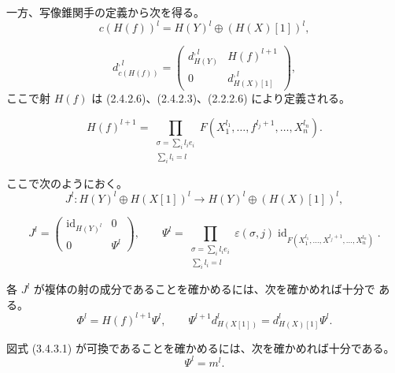 \clearpage
{}%
\begingroup
\small
\setlength{\abovedisplayskip}{3pt plus 2pt minus 2pt}%
\setlength{\belowdisplayskip}{3pt plus 2pt minus 2pt}%
\setlength{\jot}{2pt}%

一方、写像錐関手の定義から次を得る。
\[
  c(H(f))^l=H(Y)^l\oplus(H(X)[1])^l,
\]

\begin{equation}
  d_{c(H(f))}^{,l}=
  \begin{pmatrix}
    d_{H(Y)}^{,l} & H(f)^{l+1}\\
    0 & d_{H(X)[1]}^{,l}
  \end{pmatrix},
  \tag{3.4.3.4}
\end{equation}
ここで射 $H(f)$ は (2.4.2.6)、(2.4.2.3)、(2.2.2.6) により定義される。

\begin{equation}
  H(f)^{l+1}=
  \prod_{\substack{\sigma=\sum_i l_i e_i\\ \sum_i l_i=l}}
  F(X_1^{l_1},\ldots,f^{l_j+1},\ldots,X_n^{l_n}).
  \tag{3.4.3.5}
\end{equation}

ここで次のようにおく。
\[
  J^l\colon H(Y)^l\oplus H(X[1])^l
  \longrightarrow H(Y)^l\oplus(H(X)[1])^l,
\]

\begin{equation}
  J^l=
  \begin{pmatrix}
    \operatorname{id}_{H(Y)^l} & 0\\
    0 & \Psi^l
  \end{pmatrix},
  \qquad
  \Psi^l=
  \prod_{\substack{\sigma=\sum_i l_i e_i\\ \sum_i l_i=l}}
  \varepsilon(\sigma,j)
  \operatorname{id}_{F(X_1^{l_1},\ldots,X^{l_j+1},\ldots,X_n^{l_n})}.
  \tag{3.4.3.6}
\end{equation}

各 $J^l$ が複体の射の成分であることを確かめるには、次を確かめれば十分で
ある。
\begin{equation}
  \Phi^l=H(f)^{l+1}\Psi^l,
  \qquad
  \Psi^{l+1}d_{H(X[1])}^{l}=d_{H(X)[1]}^{l}\Psi^l.
  \tag{3.4.3.7}
\end{equation}

図式 (3.4.3.1) が可換であることを確かめるには、次を確かめれば十分である。
\begin{equation}
  \Psi^l=m^l.
  \tag{3.4.3.8}
\end{equation}
\endgroup
